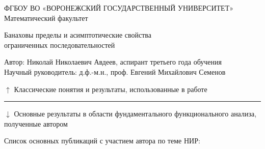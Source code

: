 \documentclass[a4paper,openbib]{report}
\renewcommand{\baselinestretch}{1.17}
\theoremstyle{definition}
\begin{document}
\thispagestyle{empty}
	\Large
	\begin{center}
		ФГБОУ ВО
		«ВОРОНЕЖСКИЙ ГОСУДАРСТВЕННЫЙ УНИВЕРСИТЕТ»
		\\
		Математический факультет
	\end{center}
	\begin{center}
		\Huge
		Банаховы пределы и асимптотические свойства \\ ограниченных последовательностей
	\end{center}
	Автор: Николай Николаевич Авдеев, аспирант третьего года обучения
	\\
	Научный руководитель: д.ф.-м.н., проф. Евгений Михайлович Семенов
	\\
	\nocite{avdeev2021subsets,avdeev2019banach,avdeev2019space,avdeed2021AandA,our-ped-2018-alpha-Tx,our-vzms-2018}

	\noindent
	
	\vfill
	\quad$\uparrow$ Классические понятия и результаты, использованные в работе
	\hrule
	\quad$\downarrow$ Основные результаты в области фундаментального функционального анализа, полученные автором
	\vfill
	\noindent
	
	\hfill
	


	\vfill

	\begin{center}
		Список основных публикаций с участием автора по теме НИР:
	\end{center}

	\renewcommand{\section}[2]{}%
	\renewcommand{\chapter}[2]{}%
	\renewcommand{\baselinestretch}{0.95}
	\printbibliography{}
	\newpage
	\printbibitembibliography{}
\end{document}
